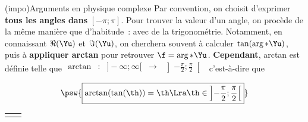 \documentclass[../../main/main.tex]{subfiles}
\begin{document}
\begin{tcb*}[breakable](impo){Arguments en physique complexe}
	Par convention, on choisit d'exprimer \textbf{tous les angles dans}
	$[-\pi;\pi]$. Pour trouver la valeur d'un angle, on procède de la même manière
	que d'habitude~: avec de la trigonométrie. Notamment, en connaissant
	$\Re(\Yu)$ et $\Im(\Yu)$, on cherchera souvent à calculer
	$\tan(\arg*{\Yu})$, puis à \textbf{appliquer arctan} pour retrouver $\f =
		\arg*{\Yu}$.
	\bigbreak
	\textbf{Cependant}, arctan est définie telle que
	$\begin{array}{ccccc}
			\arctan & : & ]-\infty;\infty[ & \to &
			\left] -\frac{\pi}{2} ; \frac{\pi}{2} \right[ \\
		\end{array}$
	c'est-à-dire que
	\[
	\psw{%
	\boxed{  \arctan(\tan(\th)) = \th \Lra \th \in
	\left]-\frac{\pi}{2} ; \frac{\pi}{2} \right[}
		}%
		\]
		\vspace{-15pt}
		\begin{center}
			\begin{tabularx}{\linewidth}{YY}
\end{tabularx}
\end{center}
\end{tcb*}
\end{document}

